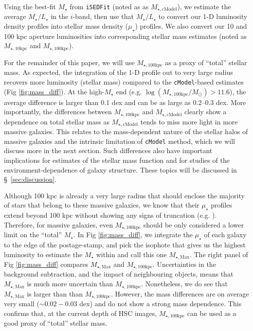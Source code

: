 \documentclass[a4paper,fleqn,usenatbib]{mnras}
\def\cmodel{\texttt{cModel}}
\def\mstar{{$M_{\star}$}}
\def\minn{{$M_{\star,10\mathrm{kpc}}$}}
\def\mtot{{$M_{\star,100\mathrm{kpc}}$}}
\def\mmax{{$M_{\star,\mathrm{Max}}$}}
\def\mcmodel{{$M_{\star,\mathrm{cModel}}$}}
\def\logmtot{{$\log (M_{\star,100\mathrm{kpc}}/M_{\odot})$}}
\def\m2l{{$M_{\star}/L_{\star}$}}
\def\mden{{$\mu_{\star}$}}
\begin{document}
    Using the best-fit \mstar{} from \texttt{iSEDFit} (noted as as \mcmodel{}), 
    we estimate the average \m2l{} in the $i$-band, then use that \m2l{} to convert 
    our 1-D luminosity density profiles into stellar mass density (\mden{}) profiles. 
    We also convert our 10 and 100 kpc aperture luminosities into corresponding stellar 
    mass estimates (noted as \minn{} and \mtot{}).

    For the remainder of this paper, we will use \mtot{} as a proxy of ``total'' 
    stellar mass. 
    As expected, the integration of the 1-D profile out to very large radius recovers 
    more luminosity (stellar mass) compared to the \cmodel{}-based estimates 
    (Fig \ref{fig:mass_diff}).
    At the high-\mstar{} end (e.g. \logmtot{}$>11.6$), the average difference is larger 
    than 0.1 dex and can be as large as 0.2--0.3 dex.  
    More importantly, the differences between \mtot{} and \mcmodel{} clearly show a 
    dependence on total stellar mass as \mcmodel{} tends to miss more light in 
    more massive galaxies.  
    This relates to the mass-dependent nature of the stellar halos of massive 
    galaxies and the intrinsic limitation of \cmodel{} method, which we will discuss
    more in the next section.
    Such differences also have important implications for estimates of the stellar 
    mass function and for studies of the environment-dependence of galaxy structure. 
    These topics will be discussed in \S~\ref{sec:discussion}.
    
    Although 100 kpc is already a very large radius that should enclose the majority 
    of stars that belong to these massive galaxies, we know that their \mden{} 
    profiles extend beyond 100 kpc without showing any signs of truncation
    (e.g. \citealt{Gonzalez2005, Tal2011, DSouza2014}).
    Therefore, for massive galaxies, even \mtot{} should be only considered a lower
    limit on the ``total'' \mstar{}. 
    In Fig \ref{fig:mass_diff}, we integrate the \mden{} of each galaxy to the 
    edge of the postage-stamp, and pick the isophote that gives us the highest  
    luminosity to estimate the \mstar{} within and call this one \mmax{}. 
    The right panel of Fig \ref{fig:mass_diff} compares \mmax{} and \mtot{}.  
    Uncertainties in the background subtraction, and the impact of neighbouring 
    objects, means that \mmax{} is much more uncertain than \mtot{}. 
    Nonetheless, we do see that \mmax{} is larger than than \mtot{}. 
    However, the mass differences are on average very small ($\sim0.02-0.03$ dex) and 
    do not show a strong mass dependence.  
    This confirms that, at the current depth of HSC images, \mtot{} can be used as 
    a good proxy of ``total'' stellar mass.   
    
\end{document}
